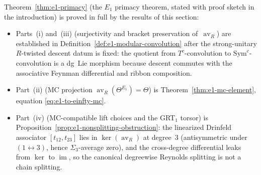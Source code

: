 \begin{remark}
\label{rem:e1-primacy-proof-collection}
Theorem~\textup{\ref{thm:e1-primacy}}
(the $E_1$ primacy theorem, stated with proof sketch in the
introduction) is proved in full by the results of this section:
\begin{itemize}
\item Parts~(i) and~(iii)
 (surjectivity and bracket preservation of~$\operatorname{av}_R$)
 are established in
 Definition~\textup{\ref{def:e1-modular-convolution}} after the
 strong-unitary $R$-twisted descent datum is fixed: the quotient from
 $T^c$-convolution to $\mathrm{Sym}^c$-convolution is a dg~Lie
 morphism because descent commutes with the associative Feynman
 differential and ribbon composition.
\item Part~(ii) (MC projection
 $\operatorname{av}_R(\Theta^{E_1}) = \Theta$)
 is Theorem~\textup{\ref{thm:e1-mc-element}}, equation
 \eqref{eq:e1-to-einfty-mc}.
\item Part~(iv) (MC-compatible lift choices and the
 GRT$_1$ torsor) is
 Proposition~\textup{\ref{prop:e1-nonsplitting-obstruction}}: the
 linearized Drinfeld associator $[t_{12}, t_{23}]$ lies in
 $\ker(\operatorname{av}_R)$ at degree~$3$ (antisymmetric under
 $(1 \leftrightarrow 3)$, hence $\Sigma_3$-average zero), and the
 cross-degree differential leaks from $\ker$ to $\operatorname{im}$,
 so the canonical degreewise Reynolds splitting is not a chain
 splitting.
\end{itemize}
\end{remark}

